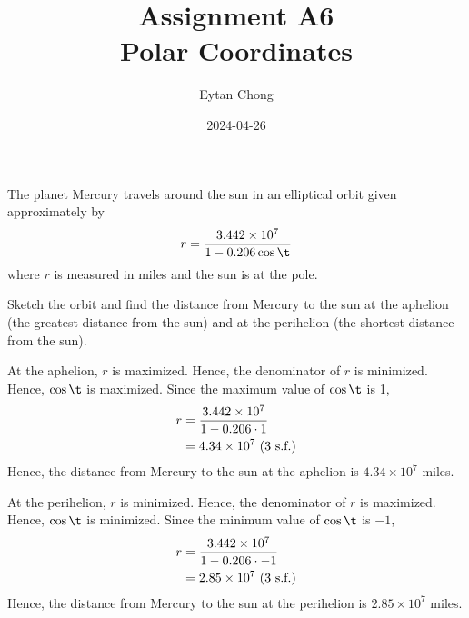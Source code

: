 \documentclass{echw}
\title{Assignment A6\\Polar Coordinates}
\author{Eytan Chong}
\date{2024-04-26}
\begin{document}
    \problem{}
        The planet Mercury travels around the sun in an elliptical orbit given approximately by
        \[
            r = \dfrac{3.442 \times 10^7}{1 - 0.206\cos\t}
        \]
         where $r$ is measured in miles and the sun is at the pole.

        Sketch the orbit and find the distance from Mercury to the sun at the aphelion (the greatest distance from the sun) and at the perihelion (the shortest distance from the sun).

    \solution
        \begin{center}
        \end{center}

        At the aphelion, $r$ is maximized. Hence, the denominator of $r$ is minimized. Hence, $\cos \t$ is maximized. Since the maximum value of $\cos \t$ is 1,
        \begin{align*}
            r &= \dfrac{3.442 \times 10^7}{1 - 0.206\cdot1}\\
            &= 4.34 \times 10^7 \text{ (3 s.f.)}
        \end{align*}
        Hence, the distance from Mercury to the sun at the aphelion is $4.34 \times 10^7$ miles.


        At the perihelion, $r$ is minimized. Hence, the denominator of $r$ is maximized. Hence, $\cos \t$ is minimized. Since the minimum value of $\cos \t$ is $-1$,
        \begin{align*}
            r &= \dfrac{3.442 \times 10^7}{1 - 0.206\cdot-1}\\
            &= 2.85 \times 10^7 \text{ (3 s.f.)}
        \end{align*}
        Hence, the distance from Mercury to the sun at the perihelion is $2.85 \times 10^7$ miles.
\end{document}

